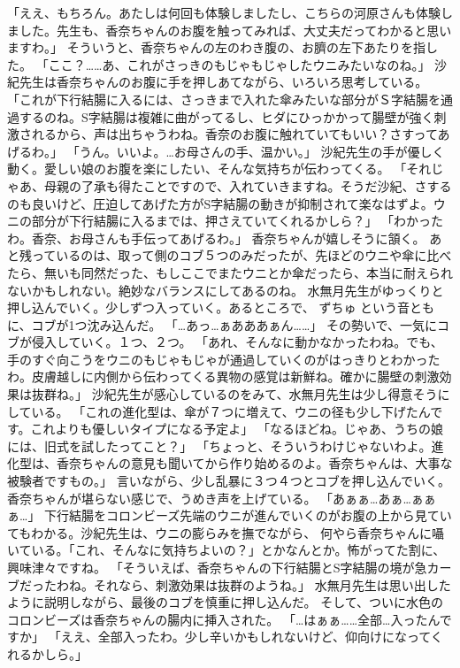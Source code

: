 「ええ、もちろん。あたしは何回も体験しましたし、こちらの河原さんも体験しました。先生も、香奈ちゃんのお腹を触ってみれば、大丈夫だってわかると思いますわ。」
そういうと、香奈ちゃんの左のわき腹の、お臍の左下あたりを指した。
「ここ？……あ、これがさっきのもじゃもじゃしたウニみたいなのね。」
沙紀先生は香奈ちゃんのお腹に手を押しあてながら、いろいろ思考している。
「これが下行結腸に入るには、さっきまで入れた傘みたいな部分がＳ字結腸を通過するのね。S字結腸は複雑に曲がってるし、ヒダにひっかかって腸壁が強く刺激されるから、声は出ちゃうわね。香奈のお腹に触れていてもいい？さすってあげるわ。」
「うん。いいよ。…お母さんの手、温かい。」
沙紀先生の手が優しく動く。愛しい娘のお腹を楽にしたい、そんな気持ちが伝わってくる。
「それじゃあ、母親の了承も得たことですので、入れていきますね。そうだ沙紀、さするのも良いけど、圧迫してあげた方がS字結腸の動きが抑制されて楽なはずよ。ウニの部分が下行結腸に入るまでは、押さえていてくれるかしら？」
「わかったわ。香奈、お母さんも手伝ってあげるわ。」
香奈ちゃんが嬉しそうに頷く。
あと残っているのは、取って側のコブ５つのみだったが、先ほどのウニや傘に比べたら、無いも同然だった、もしここでまたウニとか傘だったら、本当に耐えられないかもしれない。絶妙なバランスにしてあるのね。
水無月先生がゆっくりと押し込んでいく。少しずつ入っていく。あるところで、 ずちゅ という音ともに、コブが1つ沈み込んだ。
「…あっ…ぁあああぁん……」
その勢いで、一気にコブが侵入していく。１つ、２つ。
「あれ、そんなに動かなかったわね。でも、手のすぐ向こうをウニのもじゃもじゃが通過していくのがはっきりとわかったわ。皮膚越しに内側から伝わってくる異物の感覚は新鮮ね。確かに腸壁の刺激効果は抜群ね。」
沙紀先生が感心しているのをみて、水無月先生は少し得意そうにしている。
「これの進化型は、傘が７つに増えて、ウニの径も少し下げたんです。これよりも優しいタイプになる予定よ」
「なるほどね。じゃあ、うちの娘には、旧式を試したってこと？」
「ちょっと、そういうわけじゃないわよ。進化型は、香奈ちゃんの意見も聞いてから作り始めるのよ。香奈ちゃんは、大事な被験者ですもの。」
言いながら、少し乱暴に３つ４つとコブを押し込んでいく。香奈ちゃんが堪らない感じで、うめき声を上げている。
「あぁぁ…あぁ…ぁぁぁ…」
下行結腸をコロンビーズ先端のウニが進んでいくのがお腹の上から見ていてもわかる。沙紀先生は、ウニの膨らみを撫でながら、
何やら香奈ちゃんに囁いている。「これ、そんなに気持ちよいの？」とかなんとか。怖がってた割に、興味津々ですね。
「そういえば、香奈ちゃんの下行結腸とS字結腸の境が急カーブだったわね。それなら、刺激効果は抜群のようね。」
水無月先生は思い出したように説明しながら、最後のコブを慎重に押し込んだ。
そして、ついに水色のコロンビーズは香奈ちゃんの腸内に挿入された。
「…はぁぁ……全部…入ったんですか」
「ええ、全部入ったわ。少し辛いかもしれないけど、仰向けになってくれるかしら。」

